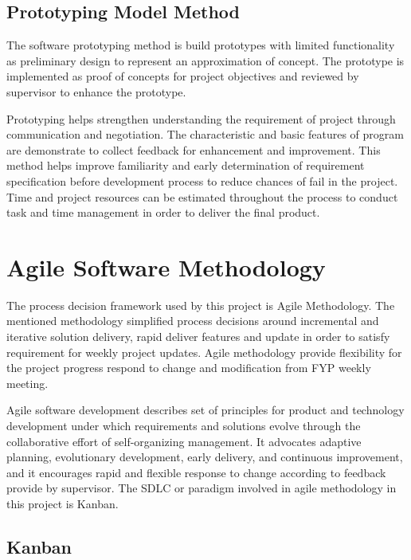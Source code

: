 \pagebreak

\subsection{Prototyping Model Method}

The software prototyping method is build prototypes with limited functionality as preliminary design to represent an approximation of concept. The prototype is implemented as proof of concepts for project objectives and reviewed by supervisor to enhance the prototype. 

Prototyping helps strengthen understanding the requirement of project through communication and negotiation. The characteristic and basic features of program are demonstrate to collect feedback for enhancement and improvement. This method helps improve familiarity and early determination of requirement specification before development process to reduce chances of fail in the project. Time and project resources can be estimated throughout the process to conduct task and time management in order to deliver the final product. 

\pagebreak

\section{Agile Software Methodology}

The process decision framework used by this project is Agile Methodology. The mentioned methodology simplified process decisions around incremental and iterative solution delivery, rapid deliver features and update in order to satisfy requirement for weekly project updates. Agile methodology provide flexibility for the project progress respond to change and modification from FYP weekly meeting.  

Agile software development describes set of principles for product and technology development under which requirements and solutions evolve through the collaborative effort of self-organizing management.  It advocates adaptive planning, evolutionary development, early delivery, and continuous improvement, and it encourages rapid and flexible response to change according to feedback provide by supervisor. The SDLC or paradigm involved in agile methodology in this project is Kanban. 

\pagebreak

\subsection{Kanban}

